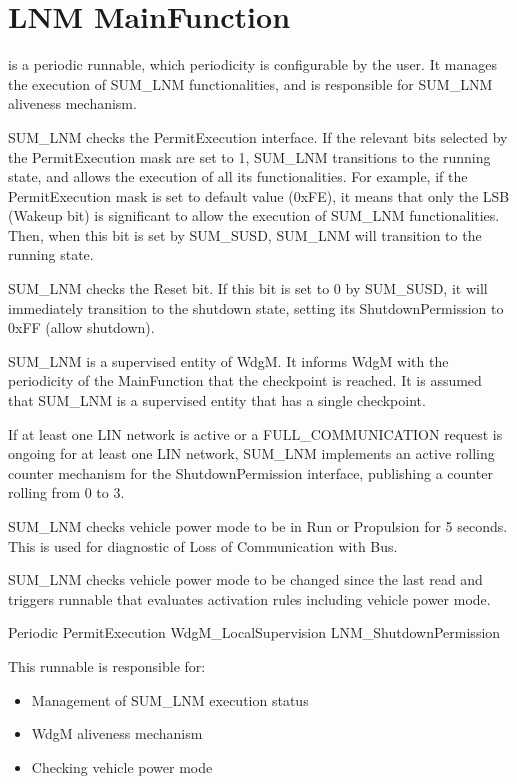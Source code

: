 \section{LNM MainFunction}
\label{sec:LNMMainFunction}

 is a periodic runnable, which periodicity is configurable by the user. It manages the execution of SUM_LNM functionalities, and is responsible for SUM_LNM aliveness mechanism.

{
SUM_LNM checks the PermitExecution interface. If the relevant bits selected by the PermitExecution mask are set to 1, SUM_LNM transitions to the running state, and allows the execution of all its functionalities.
For example, if the PermitExecution mask is set to default value (0xFE), it means that only the LSB (Wakeup bit) is significant to allow the execution of SUM_LNM functionalities. Then, when this bit is set by SUM_SUSD,
SUM_LNM will transition to the running state.
}
{    }

{
SUM_LNM checks the Reset bit. If this bit is set to 0 by SUM_SUSD, it will immediately transition to the shutdown state, setting its ShutdownPermission to 0xFF (allow shutdown).
}
{ }

{
SUM_LNM is a supervised entity of WdgM. It informs WdgM with the periodicity of the MainFunction that the checkpoint is reached. It is assumed that SUM_LNM is a supervised entity that has a single checkpoint.
}
{}

{
If at least one LIN network is active or a FULL_COMMUNICATION request is ongoing for at least one LIN network, SUM_LNM implements an active rolling counter mechanism for the ShutdownPermission interface, publishing a counter rolling from 0 to 3.
}
{ }

{
SUM_LNM checks vehicle power mode to be in Run or Propulsion for 5 seconds. This is used for diagnostic of Loss of Communication with Bus.
}
{}

{
	SUM_LNM checks vehicle power mode to be changed since the last read and triggers runnable that evaluates activation rules including vehicle power mode.
}
{}
	
{Periodic}
{}
{PermitExecution \newline WdgM_LocalSupervision}
{LNM_ShutdownPermission}
{}
{}
{This runnable is responsible for:
\begin{itemize}
\item Management of SUM_LNM execution status
\item WdgM aliveness mechanism 
\item Checking vehicle power mode 
\end{itemize}
}

